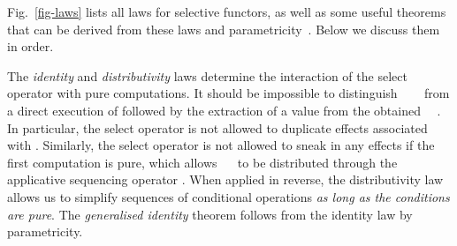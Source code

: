 {Fig.~\ref{fig-laws} lists all laws for selective functors, as well as some
useful theorems that can be derived from these laws and
parametricity~\citep{wadler1989theorems}. Below we discuss them in order.

The \emph{identity} and \emph{distributivity} laws determine the interaction of
the select operator with pure computations. It should be impossible to
distinguish ~~~ from a direct execution of 
followed by the extraction of a value from the obtained
~~. In particular, the select operator is not allowed to
duplicate effects associated with . Similarly, the select operator is not
allowed to sneak in any effects if the first computation is pure, which allows
~~ to be distributed through the applicative sequencing
operator \hs{*>}. When applied in reverse, the distributivity law allows us to
simplify sequences of conditional operations \emph{as long as the conditions are
pure}. The \emph{generalised identity} theorem follows from the identity law by
parametricity.

}
